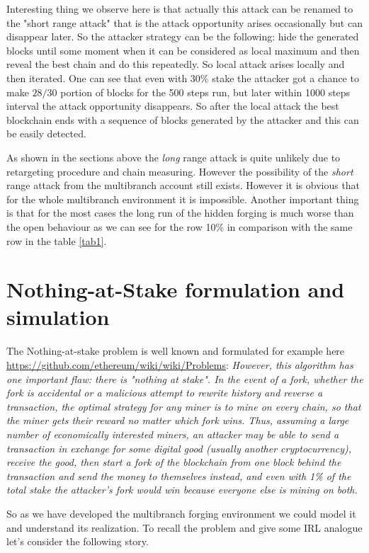 \documentclass[12pt]{article}
\begin{document}
Interesting thing we observe here is that actually this attack can be renamed to the "short range attack" that is the attack opportunity arises occasionally
but can disappear later. So the attacker strategy can be the following: hide the generated blocks until some moment when it can be considered as local maximum
and then reveal the best chain and do this repeatedly. So local attack arises locally and then iterated. One can see that even with 30\% stake the attacker got a 
chance to make $28/30$ portion of blocks for the 500 steps run, but later within 1000 steps interval the attack opportunity disappears. So after the local attack the
best blockchain ends with a sequence of blocks generated by the attacker and this can be easily detected.

As shown in the sections above the {\it long} range attack is quite unlikely due to retargeting procedure and chain measuring. However the possibility
of the {\it short} range attack from the multibranch account still exists. However it is obvious that for the whole multibranch environment it is impossible.
Another important thing is that for the most cases the long run of the hidden forging is much worse than the open behaviour as we can see for the
row 10\% in comparison with the same row in the table \ref{tab1}.      

\section{Nothing-at-Stake formulation and simulation}

The Nothing-at-stake problem is well known and formulated for example here \url{https://github.com/ethereum/wiki/wiki/Problems}:  
{\it However, this algorithm has one important flaw: there is "nothing at stake". In the event of a fork, whether the fork is accidental or a malicious attempt to rewrite history and reverse a transaction, the optimal strategy for any miner is to mine on every chain, so that the miner gets their reward no matter which fork wins. Thus, assuming a large number of economically interested miners, an attacker may be able to send a transaction in exchange for some digital good (usually another cryptocurrency), receive the good, then start a fork of the blockchain from one block behind the transaction and send the money to themselves instead, and even with 1\% of the total stake the attacker's fork would win because everyone else is mining on both.}

So as we have developed the multibranch forging environment we could model it and understand its realization. To recall the problem and give 
some IRL analogue let's consider the following story. 
\end{document}
